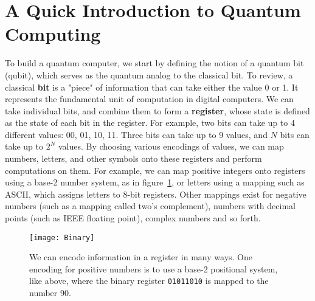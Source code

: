 \section{A Quick Introduction to Quantum Computing}
\label{sec:qc}
To build a quantum computer, we start by defining the notion of a quantum bit (qubit), which
serves as the quantum analog to the classical bit. To review, a classical \textbf{bit} is a "piece" of information
that can take either the value 0 or 1. It represents the fundamental unit of computation in digital computers.
We can take individual bits, and combine them to form a \textbf{register}, whose state is defined as
the state of each bit in the register. For example, two bits can take up to 4 different
values: 00, 01, 10, 11. Three bits can take up to 9 values, and $N$ bits can take up to $2^N$ values.
By choosing various encodings of values, we can map numbers, letters, and other symbols onto these registers
and perform computations on them. For example, we can map positive integers onto registers using a base-2 number
system, as in figure~\ref{fig:binary}, or letters using a mapping such as ASCII, which assigns letters to 8-bit registers.
Other mappings exist for negative numbers (such as a mapping called two's complement), numbers with
decimal points (such as IEEE floating point), complex numbers and so forth.

\begin{figure}
  \texttt{[image: Binary]}
  \caption[Binary Coding]
  {We can encode information in a register in many ways. One encoding for positive numbers is to use a base-2
  positional system, like above, where the binary register \texttt{01011010} is mapped to the number 90.}
  \label{fig:binary}
\end{figure}

